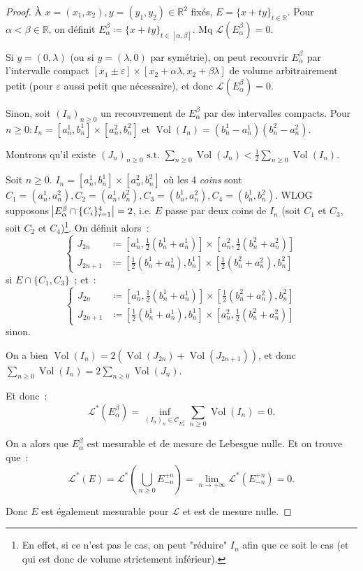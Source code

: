 \documentclass{article}
\newcommand{\pinfty}{{+\infty}}
\newcommand{\st}{\text{ s.t. }}
\newcommand{\R}{{\mathbb R}}
\DeclareMathOperator{\Vol}{Vol}
\begin{document}
\begin{proof} À $x = (x_1, x_2), y = (y_1, y_2) \in \R^2$ fixés, $E = \{x + ty\}_{t \in \R}$. Pour $\alpha < \beta \in \R$, on définit
$E_\alpha^\beta \coloneqq \{x+ty\}_{t \in [\alpha, \beta]}$. Mq $\mathcal L(E_\alpha^\beta) = 0$.

Si $y = (0, \lambda)$ (ou si $y = (\lambda, 0)$ par symétrie), on peut recouvrir $E_\alpha^\beta$ par l'intervalle compact
$[x_1 \pm \varepsilon] \times [x_2+\alpha\lambda, x_2+\beta\lambda]$ de volume arbitrairement petit (pour $\varepsilon$ aussi petit que nécessaire), et donc
$\mathcal L(E_\alpha^\beta) = 0$.

Sinon, soit $(I_n)_{n \geq 0}$ un recouvrement de $E_\alpha^\beta$ par des intervalles compacts. Pour $n \geq 0 : I_n = [a_n^1, b_n^1] \times [a_n^2, b_n^2]$ et
$\Vol(I_n) = (b_n^1-a_n^1)(b_n^2-a_n^2)$.

Montrons qu'il existe $(J_n)_{n \geq 0} \st \sum_{n \geq 0}\Vol(J_n) < \frac 12\sum_{n \geq 0}\Vol(I_n)$.

Soit $n \geq 0$. $I_n = [a_n^1, b_n^1] \times [a_n^2, b_n^2]$ où les 4 \textit{coins} sont $C_1 = (a_n^1, a_n^2), C_2 = (a_n^1, b_n^2), C_3 = (b_n^1, a_n^2), C_4 = (b_n^1, b_n^2)$.
WLOG supposons $\abs {E_\alpha^\beta \cap \{C_i\}_{i=1}^4} = 2$, i.e. $E$ passe par deux coins de $I_n$ (soit $C_1$ et $C_3$, soit $C_2$ et $C_4$)\footnote{En effet, si ce n'est pas
le cas, on peut "réduire" $I_n$ afin que ce soit le cas (et qui est donc de volume strictement inférieur).}. On définit alors~:
\[\begin{cases}
	J_{2n}   &\coloneqq [a_n^1, \frac 12(b_n^1 + a_n^1)] \times [a_n^2, \frac 12(b_n^2 + a_n^2)] \\
	J_{2n+1} &\coloneqq [\frac 12(b_n^1 + a_n^1), b_n^1] \times [\frac 12(b_n^2 + a_n^2), b_n^2]
\end{cases}\]
si $E \cap \{C_1, C_3\}$~; et~:
\[\begin{cases}
	J_{2n}   &\coloneqq [a_n^1, \frac 12(b_n^1 + a_n^1)] \times [\frac 12(b_n^2 + a_n^2), b_n^2] \\
	J_{2n+1} &\coloneqq [\frac 12(b_n^1 + a_n^1), b_n^1] \times [a_n^2, \frac 12(b_n^2 + a_n^2)]
\end{cases}\]
sinon.

On a bien $\Vol(I_n) = 2\left(\Vol(J_{2n}) + \Vol(J_{2n+1})\right)$, et donc $\sum_{n \geq 0}\Vol(I_n) = 2\sum_{n \geq 0}\Vol(J_n)$.

Et donc~:
\[\mathcal L^*(E_\alpha^\beta) = \inf_{(I_n)_n \in \mathcal C_{E_\alpha^\beta}}\sum_{n \geq 0}\Vol(I_n) = 0.\]

On a alors que $E_\alpha^\beta$ est mesurable et de mesure de Lebesgue nulle. Et on trouve que~:
\[\mathcal L^*(E) = \mathcal L^*(\bigcup_{n \geq 0}E_{-n}^{+n}) = \lim_{n \to \pinfty}\mathcal L^*(E_{-n}^{+n}) = 0.\]

Donc $E$ est également mesurable pour $\mathcal L$ et est de mesure nulle.
\end{proof}
\end{document}
